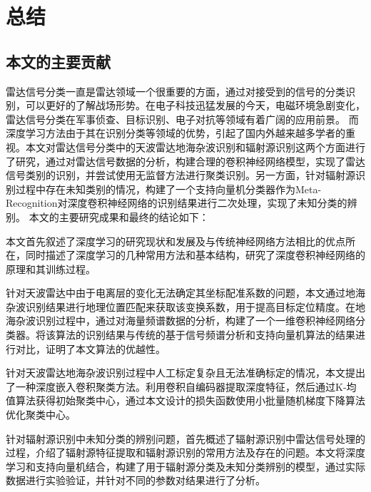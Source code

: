 
\chapter{总结}
\label{sec:paper_summary}
\section{本文的主要贡献}
雷达信号分类一直是雷达领域一个很重要的方面，通过对接受到的信号的分类识别，可以更好的了解战场形势。在电子科技迅猛发展的今天，电磁环境急剧变化，雷达信号分类在军事侦查、目标识别、电子对抗等领域有着广阔的应用前景。
而深度学习方法由于其在识别分类等领域的优势，引起了国内外越来越多学者的重视。本文对雷达信号分类中的天波雷达地海杂波识别和辐射源识别这两个方面进行了研究，通过对雷达信号数据的分析，构建合理的卷积神经网络模型，实现了雷达信号类别的识别，并尝试使用无监督方法进行聚类识别。另一方面，针对辐射源识别过程中存在未知类别的情况，构建了一个支持向量机分类器作为Meta-Recognition对深度卷积神经网络的识别结果进行二次处理，实现了未知分类的辨别。
本文的主要研究成果和最终的结论如下：

本文首先叙述了深度学习的研究现状和发展及与传统神经网络方法相比的优点所在，同时描述了深度学习的几种常用方法和基本结构，研究了深度卷积神经网络的原理和其训练过程。

针对天波雷达中由于电离层的变化无法确定其坐标配准系数的问题，本文通过地海杂波识别结果进行地理位置匹配来获取该变换系数，用于提高目标定位精度。在地海杂波识别过程中，通过对海量频谱数据的分析，构建了一个一维卷积神经网络分类器。将该算法的识别结果与传统的基于信号频谱分析和支持向量机算法的结果进行对比，证明了本文算法的优越性。

针对天波雷达地海杂波识别过程中人工标定复杂且无法准确标定的情况，本文提出了一种深度嵌入卷积聚类方法。利用卷积自编码器提取深度特征，然后通过K-均值算法获得初始聚类中心，通过本文设计的损失函数使用小批量随机梯度下降算法优化聚类中心。

针对辐射源识别中未知分类的辨别问题，首先概述了辐射源识别中雷达信号处理的过程，介绍了辐射源特征提取和辐射源识别的常用方法及存在的问题。本文将深度学习和支持向量机结合，构建了用于辐射源分类及未知分类辨别的模型，通过实际数据进行实验验证，并针对不同的参数对结果进行了分析。
